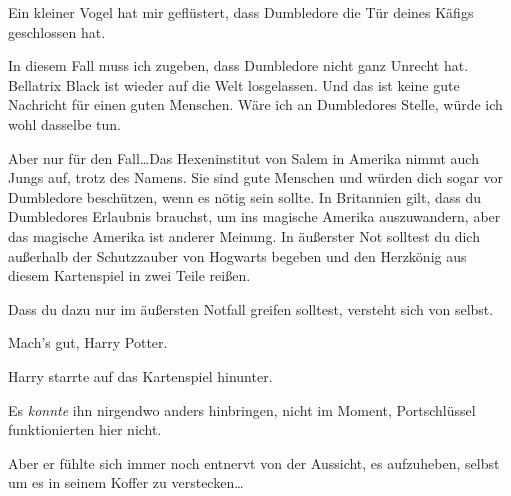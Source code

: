 \begin{writtenNote}
Ein kleiner Vogel hat mir geflüstert, dass Dumbledore die Tür deines Käfigs geschlossen hat.

In diesem Fall muss ich zugeben, dass Dumbledore nicht ganz Unrecht hat. Bellatrix Black ist wieder auf die Welt losgelassen. Und das ist keine gute Nachricht für einen guten Menschen. Wäre ich an Dumbledores Stelle, würde ich wohl dasselbe tun.

Aber nur für den Fall…Das Hexeninstitut von Salem in Amerika nimmt auch Jungs auf, trotz des Namens. Sie sind gute Menschen und würden dich sogar vor Dumbledore beschützen, wenn es nötig sein sollte. In Britannien gilt, dass du Dumbledores Erlaubnis brauchst, um ins magische Amerika auszuwandern, aber das magische Amerika ist anderer Meinung. In äußerster Not solltest du dich außerhalb der Schutzzauber von Hogwarts begeben und den Herzkönig aus diesem Kartenspiel in zwei Teile reißen.

Dass du dazu nur im äußersten Notfall greifen solltest, versteht sich von selbst.

Mach’s gut, Harry Potter.

\end{writtenNote}

Harry starrte auf das Kartenspiel hinunter.

Es \emph{konnte} ihn nirgendwo anders hinbringen, nicht im Moment, Portschlüssel funktionierten hier nicht.

Aber er fühlte sich immer noch entnervt von der Aussicht, es aufzuheben, selbst um es in seinem Koffer zu verstecken…

